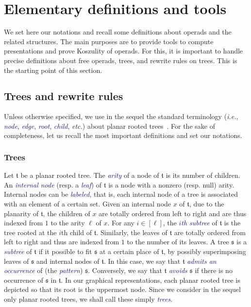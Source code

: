 \documentclass[10pt,reqno]{amsart}
\numberwithin{equation}{subsection}
\newcommand{\Tfr}{\mathfrak{t}}
\newcommand{\Sfr}{\mathfrak{s}}
\newcommand{\Def}[1]{\textcolor{MidnightBlue}{\em #1}}
\begin{document}
\section{Elementary definitions and tools}
\label{sec:definitions_tools}
We set here our notations and recall some definitions about operads and
the related structures. The main purposes are to provide tools to
compute presentations and prove Koszulity of operads. For this, it is
important to handle precise definitions about free operads, trees,
and rewrite rules on trees. This is the starting point of this section.
\medskip

\subsection{Trees and rewrite rules}
Unless otherwise specified, we use in the sequel the standard
terminology ({\em i.e.}, \Def{node}, \Def{edge}, \Def{root}, \Def{child},
{\em etc.}) about planar rooted trees~\cite{Knu97}. For the sake of
completeness, let us recall the most important definitions and set our
notations.
\medskip

\subsubsection{Trees}
Let $\Tfr$ be a planar rooted tree. The \Def{arity} of a node of $\Tfr$
is its number of children. An \Def{internal node} (resp. a \Def{leaf})
of $\Tfr$ is a node with a nonzero (resp. null) arity. Internal nodes
can be \Def{labeled}, that is, each internal node of a tree is associated
with an element of a certain set. Given an internal node $x$ of $\Tfr$,
due to the planarity of $\Tfr$, the children of $x$ are totally ordered
from left to right and are thus indexed from $1$ to the arity $\ell$ of
$x$. For any $i \in [\ell]$, the \Def{$i$th subtree} of $\Tfr$ is the
tree rooted at the $i$th child of $\Tfr$. Similarly, the leaves of
$\Tfr$ are totally ordered from left to right and thus are indexed from
$1$ to the number of its leaves. A tree $\Sfr$ is a \Def{subtree} of
$\Tfr$ if it possible to fit $\Sfr$ at a certain place of $\Tfr$, by
possibly superimposing leaves of $\Sfr$ and internal nodes of $\Tfr$. In
this case, we say that $\Tfr$ \Def{admits an occurrence} of (the
\Def{pattern}) $\Sfr$. Conversely, we say that $\Tfr$ \Def{avoids}
$\Sfr$ if there is no occurrence of $\Sfr$ in $\Tfr$. In our graphical
representations, each planar rooted tree is depicted so that its root is
the uppermost node. Since we consider in the sequel only planar rooted
trees, we shall call these simply \Def{trees}.
\medskip
\end{document}
